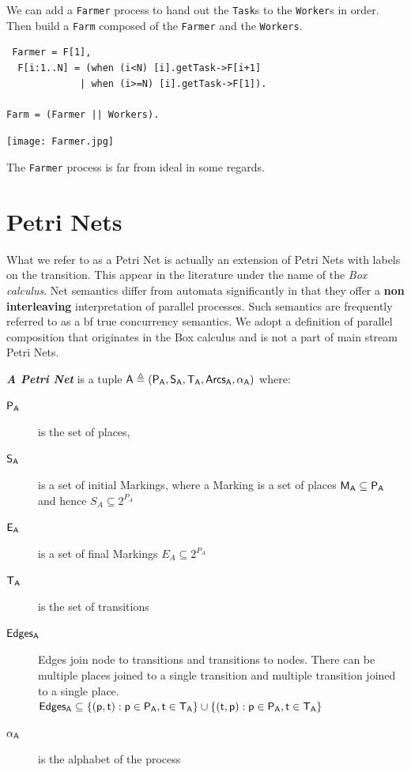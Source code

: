 \documentclass[]{article}
\begin{document}
 We can add a \verb$Farmer$ process to hand out the \verb$Task$s to the \verb$Worker$s in order. Then  build a \verb$Farm$ composed of the \verb$Farmer$ and the \verb$Workers$.

\begin{center}\begin{minipage}{0.55\textwidth}
\begin{verbatim}
 Farmer = F[1],
  F[i:1..N] = (when (i<N) [i].getTask->F[i+1]
             | when (i>=N) [i].getTask->F[1]).

Farm = (Farmer || Workers).
   \end{verbatim}
\end{minipage}\begin{minipage}{0.4\textwidth}
\begin{center}\texttt{[image: Farmer.jpg]}\end{center}
\end{minipage}
\end{center}

The \verb$Farmer$  process is far from ideal in some regards.

\section{Petri Nets }



What we refer to as a Petri Net is actually an extension of Petri Nets with labels on the  transition.  This appear in the literature under the name of the \emph{Box calculus}.  Net semantics differ from automata significantly in that they offer a {\bf non interleaving} interpretation of parallel processes. Such semantics are frequently referred to as a {bf true concurrency} semantics.
We adopt a definition of parallel composition that originates in the Box calculus and is not a part of main stream Petri Nets.


\emph{\bf A Petri Net} is a tuple  $\sf A \triangleq (P_A,S_A,T_A,Arcs_A,\alpha_A)$  where:
\begin{description}
\item[$\sf P_A$] is the set of places,
\item[$\sf S_A$] is a  set of  initial  Markings, where a Marking is  a set of places  $\sf M_A\subseteq P_A$ and hence $S_A \subseteq 2^{P_A}$
\item[$\sf E_A$] is a  set of final  Markings $E_A \subseteq 2^{P_A}$
\item[$\sf T_A$] is the set of transitions
\item[$\sf Edges_A$] Edges join node to transitions and transitions to nodes. There can be multiple places joined to a single transition and multiple transition joined to a single place.
\newline
$\sf Edges_A\subseteq \{(p,t): p\in P_A, t\in T_A \}  \cup \{(t,p): p\in P_A, t\in T_A \}$
\item[$\sf \alpha_A$] is the alphabet of the process

\end{description}
\end{document}
